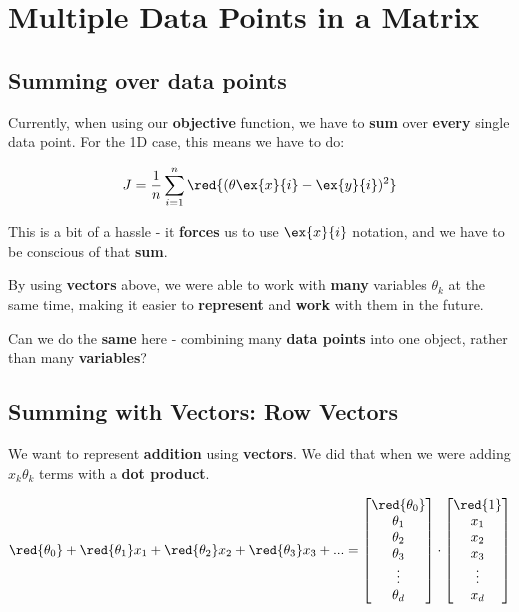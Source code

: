\section*{Multiple Data Points in a Matrix}




    \subsection*{Summing over data points}
    
        Currently, when using our \textbf{objective} function, we have to \textbf{sum} over \textbf{every} single data point. For the 1D case, this means we have to do:
        
        \begin{equation}
            J = 
            \frac{1}{n}  \sum_{i=1}^n \red{(\theta \ex{x}{i}  - \ex{y}{i} )^2} 
        \end{equation}
        
        This is a bit of a hassle - it \textbf{forces} us to use $\ex{x}{i}$ notation, and we have to be conscious of that \textbf{sum}.
        
        By using \textbf{vectors} above, we were able to work with \textbf{many} variables $\theta_k$ at the same time, making it easier to \textbf{represent} and \textbf{work} with them in the future. 
        
        Can we do the \textbf{same} here - combining many \textbf{data points} into one object, rather than many \textbf{variables}?
    
    \subsection*{Summing with Vectors: Row Vectors}
        
        We want to represent \textbf{addition} using \textbf{vectors}. We did that when we were adding $x_k\theta_k$ terms with a \textbf{dot product}.
        
        \begin{equation}
            \red{\theta_0} + \red{\theta_1}x_1 + \red{\theta_2}x_2 + \red{\theta_3}x_3 + ...
            =
            \begin{bmatrix}
              \red{\theta_0} \\ \theta_1 \\ \theta_2 \\ \theta_3 \\ \vdots \\ \theta_d
            \end{bmatrix}
            \cdot
            \begin{bmatrix}
              \red{1} \\ x_1 \\ x_2 \\ x_3 \\ \vdots \\ x_d
            \end{bmatrix}
        \end{equation}
        
